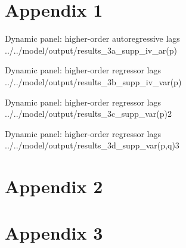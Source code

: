 \section*{Appendix 1}
\label{app-dynamic-panel-ho-ar}

\wraptable
    {Dynamic panel: higher-order autoregressive lags}
    {../../model/output/results_3a_supp_iv_ar(p)}
    {}

\wraptable
    {Dynamic panel: higher-order regressor lags}
    {../../model/output/results_3b_supp_iv_var(p)}
    {}

\wraptable
    {Dynamic panel: higher-order regressor lags}
    {../../model/output/results_3c_supp_var(p)2}
    {}
    
\wraptable
    {Dynamic panel: higher-order regressor lags}
    {../../model/output/results_3d_supp_var(p,q)3}
    {}

\newpage

\section*{Appendix 2}

\newpage

\section*{Appendix 3}
